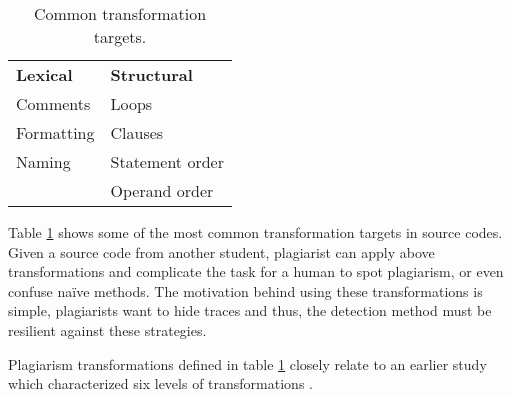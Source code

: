 \begin{table}[ht]
\centering
\caption{Common transformation targets.}
\label{tbl-plag-strat}
\begin{tabular}{|l|l|} \hline
 \textbf{Lexical} & \textbf{Structural} \\ \hhline{|=|=|}
 Comments                    & Loops                          \\
 Formatting                  & Clauses                        \\
 Naming                      & Statement order                \\
                             & Operand order               \\ \hline
\end{tabular}
\end{table}

Table \ref{tbl-plag-strat} shows some of the most common transformation targets in source codes. Given a source code from another student, plagiarist can apply above transformations and complicate the task for a human to spot plagiarism, or even confuse naïve methods. The motivation behind using these transformations is simple, plagiarists want to hide traces and thus, the detection method must be resilient against these strategies.


Plagiarism transformations defined in table \ref{tbl-plag-strat} closely relate to an earlier study which characterized six levels of transformations \cite{Faidhi:1987:EAD:27319.27321}.

\begin{table}[ht]
\centering
\caption{Transformation levels.}
\label{tbl-plag-transf}
\end{table}

